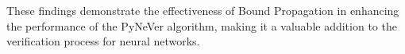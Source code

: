 These findings demonstrate the effectiveness of Bound Propagation in enhancing the performance of the PyNeVer algorithm, making it a valuable addition to the verification process for neural networks.

